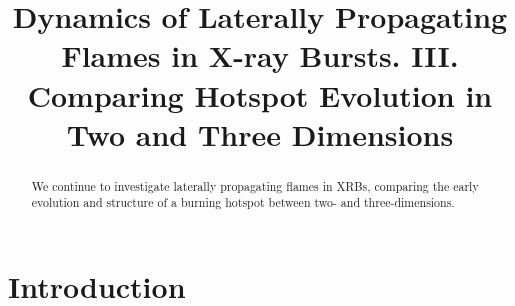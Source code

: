 \documentclass[preprint,times,tighten]{aastex631}
\begin{document}
\title{Dynamics of Laterally Propagating Flames in X-ray Bursts. III. Comparing Hotspot Evolution in Two and Three Dimensions}












\begin{abstract}
We continue to investigate laterally propagating flames in XRBs,
comparing the early evolution and structure of a burning hotspot
between two- and three-dimensions.
\end{abstract}


\section{Introduction}\label{Sec:Introduction}
\end{document}
